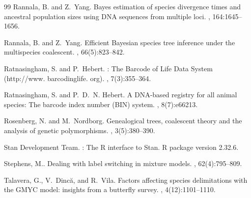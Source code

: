 \documentclass[12pt]{article}
\begin{document}
\begin{thebibliography}{99}
Rannala, B. and Z.~Yang\leavevmode\nopagebreak{}.
\newblock Bayes estimation of species divergence times and ancestral population
  sizes using {DNA} sequences from multiple loci.
, 164:1645--1656.

Rannala, B. and Z.~Yang\leavevmode\nopagebreak{}.
\newblock Efficient {B}ayesian species tree inference under the multispecies
  coalescent.
, 66(5):823--842.

Ratnasingham, S. and P.~Hebert\leavevmode\nopagebreak{}.
: {T}he {B}arcode of {L}ife {D}ata {S}ystem (http://www.
  barcodinglife. org).
, 7(3):355--364.

Ratnasingham, S. and P.~D.~N. Hebert\leavevmode\nopagebreak{}.
\newblock A {DNA}-based registry for all animal species: {T}he barcode index
  number ({BIN}) system.
, 8(7):e66213.

Rosenberg, N. and M.~Nordborg\leavevmode\nopagebreak{}.
\newblock Genealogical trees, coalescent theory and the analysis of genetic
  polymorphisms.
, 3(5):380--390.

{Stan Development Team}\leavevmode\nopagebreak{}.
: {T}he {R} interface to {Stan}.
\newblock R package version 2.32.6.

Stephens, M.\leavevmode\nopagebreak{}.
\newblock Dealing with label switching in mixture models.
, 62(4):795--809.

Talavera, G., V.~Dincă, and R.~Vila\leavevmode\nopagebreak{}.
\newblock Factors affecting species delimitations with the {GMYC} model:
  insights from a butterfly survey.
, 4(12):1101--1110.


\end{thebibliography}
\end{document}
